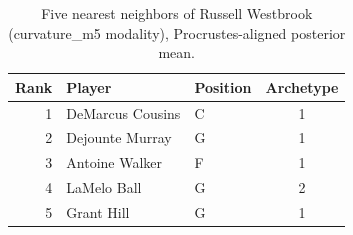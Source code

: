 \begin{table}[htbp]
  \centering\small
  \begin{tabular}{rllc}
    \toprule
    Rank & Player & Position & Archetype \\
    \midrule
    1 & DeMarcus Cousins & C & 1 \\
    2 & Dejounte Murray & G & 1 \\
    3 & Antoine Walker & F & 1 \\
    4 & LaMelo Ball & G & 2 \\
    5 & Grant Hill & G & 1 \\
    \bottomrule
  \end{tabular}
  \caption{Five nearest neighbors of Russell Westbrook (curvature_m5 modality), Procrustes-aligned posterior mean.}
  \label{tab:Russell_Westbrook_neighbors_curvature_m5}
\end{table}

